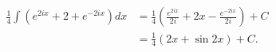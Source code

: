 \begin{align} \frac14\int \left( e^{2ix} + 2 + e^{-2ix} \right) dx &= \frac14\left(\frac{e^{2ix}}{2i} + 2x - \frac{e^{-2ix}}{2i}\right)+C \\[6pt] &= \frac14\left(2x + \sin 2x\right) +C. \end{align}
